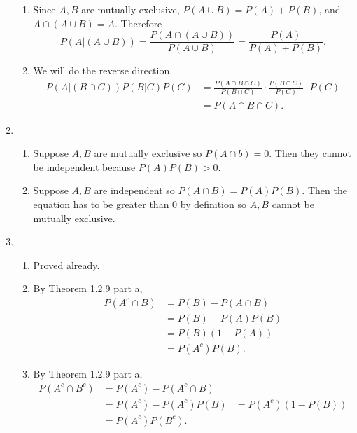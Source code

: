 \documentclass{article}
\begin{document}
\begin{enumerate}
\begin{enumerate}
        \item Since $A, B$ are mutually exclusive, $P(A \cup B) = P(A) + P(B)$, and 
        $A \cap (A \cup B) = A$. Therefore 
        \[ P(A|(A \cup B)) = \frac{P(A \cap (A \cup B))}{P(A \cup B)} 
        = \frac{P(A)}{P(A) + P(B)}. \]

        \item We will do the reverse direction.
        \begin{align*}
            P(A|(B \cap C))P(B|C)P(C) 
            &= \frac{P(A \cap B \cap C)}{P(B \cap C)} \cdot \frac{P(B \cap C)}{P(C)} 
            \cdot P(C) \\
            &= P(A \cap B \cap C).
        \end{align*}
    \end{enumerate}

    \item \begin{enumerate}
        \item Suppose $A, B$ are mutually exclusive so $P(A \cap b) = 0$. Then they cannot be 
        independent because $P(A)P(B) > 0$.

        \item Suppose $A, B$ are independent so $P(A \cap B) = P(A)P(B)$. Then the equation 
        has to be greater than 0 by definition so $A, B$ cannot be mutually exclusive.
    \end{enumerate}

    \item \begin{enumerate}
        \item Proved already.

        \item By Theorem 1.2.9 part a, 
        \begin{align*}
            P(A^c \cap B) 
            &= P(B) - P(A \cap B) \\
            &= P(B) - P(A)P(B) \\
            &= P(B)(1 - P(A)) \\
            &= P(A^{c})P(B).
        \end{align*}

        \item By Theorem 1.2.9 part a, 
        \begin{align*}
            P(A^c \cap B^c) 
            &= P(A^c) - P(A^c \cap B) \\
            &= P(A^{c}) - P(A^{c})P(B)
            &= P(A^{c})(1 - P(B)) \\
            &= P(A^{c})P(B^{c}).
        \end{align*}
    \end{enumerate}


\end{enumerate}
\end{document}
